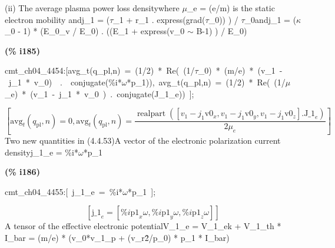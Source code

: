 \documentclass[fleqn]{article}
\begin{document}
(ii) The average plasma power loss densitywhere \ensuremath{\mu}\_e = (e/m) is the static electron mobility andj\_1 = (\ensuremath{\tau}\_1 + r\_1 . express(grad(\ensuremath{\tau}\_0)) ) / \ensuremath{\tau}\_0andj\_1 = (\ensuremath{\kappa}\_0 - 1) * (E\_0\_v / E\_0) .  ((E\_1 +  express(v\_0 \ensuremath{\sim } B-1)  ) / E\_0)


\noindent
\begin{minipage}[t]{4.000000em}\color{red}\bfseries
(\% i185)	
\end{minipage}
\begin{minipage}[t]{\textwidth}\color{blue}
cmt\_ch04\_4454:[avg\_t(q\_pl,n)\ =\ (1/2)\ *\ Re(\ (1/\ensuremath{\tau}\_0)\ *\ (m/e)\ *\ (v\_1\ -\ j\_1\ *\ v\_0)\ \ .\ \ conjugate(\%i*\ensuremath{\omega}*p\_1)),\ avg\_t(q\_pl,n)\ =\ (1/2)\ *\ Re(\ (1/\ensuremath{\mu}\_e)\ *\ (v\_1\ -\ j\_1\ *\ v\_0\ )\ .\ conjugate(J\_1\_e))\ ];
\end{minipage}
\[\displaystyle \tag{\% o185} 
\left[ {{\ensuremath{\mathrm{avg}}}_t}\left( {q_{\ensuremath{\mathrm{pl}}}}\operatorname{,}n\right) =0\operatorname{,}{{\ensuremath{\mathrm{avg}}}_t}\left( {q_{\ensuremath{\mathrm{pl}}}}\operatorname{,}n\right) =\frac{\operatorname{realpart}\left( \left[ {v_1}-{j_1} {{\ensuremath{\mathrm{v0}}}_x}\operatorname{,}{v_1}-{j_1} {{\ensuremath{\mathrm{v0}}}_y}\operatorname{,}{v_1}-{j_1} {{\ensuremath{\mathrm{v0}}}_z}\right] \ensuremath{\mathrm{ . }}{{\ensuremath{\mathrm{J\_ 1}}}_e}\right) }{2 {{\mu }_e}}\right] \mbox{}
\]
Two new quantities in (4.4.53)A vector of the electronic polarization  current densityj\_1\_e = \%i*\ensuremath{\omega}*p\_1


\noindent
\begin{minipage}[t]{4.000000em}\color{red}\bfseries
(\% i186)	
\end{minipage}
\begin{minipage}[t]{\textwidth}\color{blue}
cmt\_ch04\_4455:[\ j\_1\_e\ =\ \%i*\ensuremath{\omega}*p\_1\ ];
\end{minipage}
\[\displaystyle \tag{\% o186} 
\left[ {{\ensuremath{\mathrm{j\_ 1}}}_e}=\left[ \% i {{\ensuremath{\mathrm{p1}}}_x} \omega \operatorname{,}\% i {{\ensuremath{\mathrm{p1}}}_y} \omega \operatorname{,}\% i {{\ensuremath{\mathrm{p1}}}_z} \omega \right] \right] \mbox{}
\]
A tensor of the effective electronic potentialV\_1\_e = V\_1\_ek + V\_1\_th * I\_bar = (m/e) * (v\_0*v\_1\_p + (v\_r\^ 2/p\_0) * p\_1 * I\_bar)
\end{document}
